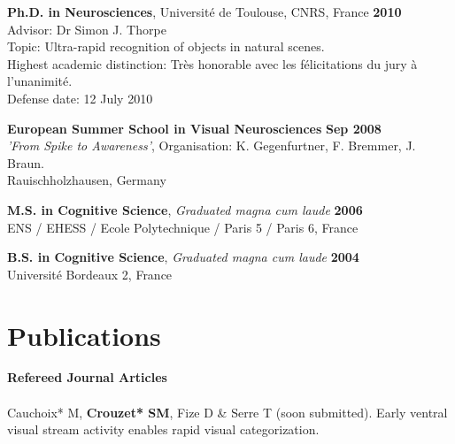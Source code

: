 \documentclass[margin,line]{resume}
\begin{document}
\begin{resume}
    \textbf{Ph.D. in Neurosciences}, Université de Toulouse, CNRS, France \hfill \textbf{2010}\\
	Advisor:  Dr Simon J. Thorpe\\
	Topic: Ultra-rapid recognition of objects in natural scenes.\\
	Highest academic distinction: Très honorable avec les félicitations du jury à l'unanimité.\\
	Defense date: 12 July 2010
	\vspace{-1.5mm}

	\textbf{European Summer School in Visual Neurosciences} \hfill \textbf{Sep 2008}\\
	\textsl{'From Spike to Awareness'}, Organisation: K. Gegenfurtner, F. Bremmer, J. Braun.\\
	Rauischholzhausen, Germany
	\vspace{-1.5mm}

	\textbf{M.S. in Cognitive Science}, \textsl{Graduated magna cum laude} \hfill \textbf{2006}\\
	ENS / EHESS / Ecole Polytechnique / Paris 5 / Paris 6, France
	\vspace{-1.5mm}

	\textbf{B.S. in Cognitive Science}, \textsl{Graduated magna cum laude} \hfill \textbf{2004}\\
	Université Bordeaux 2, France





	\vspace{3mm}	
    \section{\mysidestyle Publications}

	\textbf{Refereed Journal Articles}\\\\
	Cauchoix* M, \textbf{Crouzet* SM}, Fize D \& Serre T (soon submitted). Early ventral visual stream activity enables rapid visual categorization.
	

\end{resume}
\end{document}

